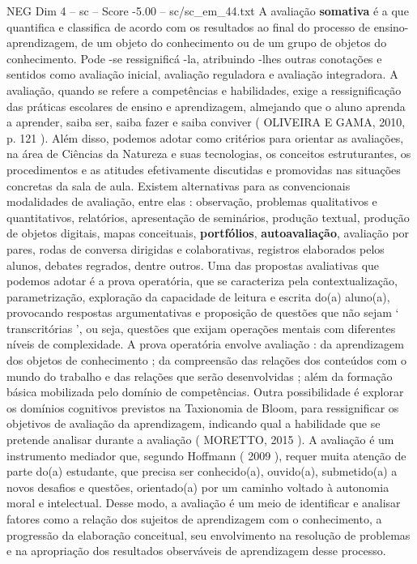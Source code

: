 \begin{textsample}{NEG Dim 4 – sc – Score -5.00 – sc/sc\_em\_44.txt}
A avaliação \textbf{somativa} é a que quantifica e classifica de acordo com os resultados ao final do processo de ensino-aprendizagem, de um objeto do conhecimento ou de um grupo de objetos do conhecimento.
Pode -se ressignificá -la, atribuindo -lhes outras conotações e sentidos como avaliação inicial, avaliação reguladora e avaliação integradora.
A avaliação, quando se refere a competências e habilidades, exige a ressignificação das práticas escolares de ensino e aprendizagem, almejando que o aluno aprenda a aprender, saiba ser, saiba fazer e saiba conviver ( OLIVEIRA E GAMA, 2010, p. 121 ).
Além disso, podemos adotar como critérios para orientar as avaliações, na área de Ciências da Natureza e suas tecnologias, os conceitos estruturantes, os procedimentos e as atitudes efetivamente discutidas e promovidas nas situações concretas da sala de aula.
Existem alternativas para as convencionais modalidades de avaliação, entre elas : observação, problemas qualitativos e quantitativos, relatórios, apresentação de seminários, produção textual, produção de objetos digitais, mapas conceituais, \textbf{portfólios}, \textbf{autoavaliação}, avaliação por pares, rodas de conversa dirigidas e colaborativas, registros elaborados pelos alunos, debates regrados, dentre outros.
Uma das propostas avaliativas que podemos adotar é a prova operatória, que se caracteriza pela contextualização, parametrização, exploração da capacidade de leitura e escrita do(a) aluno(a), provocando respostas argumentativas e proposição de questões que não sejam ‘ transcritórias ’, ou seja, questões que exijam operações mentais com diferentes níveis de complexidade.
A prova operatória envolve avaliação : da aprendizagem dos objetos de conhecimento ; da compreensão das relações dos conteúdos com o mundo do trabalho e das relações que serão desenvolvidas ; além da formação básica mobilizada pelo domínio de competências.
Outra possibilidade é explorar os domínios cognitivos previstos na Taxionomia de Bloom, para ressignificar os objetivos de avaliação da aprendizagem, indicando qual a habilidade que se pretende analisar durante a avaliação ( MORETTO, 2015 ).
A avaliação é um instrumento mediador que, segundo Hoffmann ( 2009 ), requer muita atenção de parte do(a) estudante, que precisa ser conhecido(a), ouvido(a), submetido(a) a novos desafios e questões, orientado(a) por um caminho voltado à autonomia moral e intelectual.
Desse modo, a avaliação é um meio de identificar e analisar fatores como a relação dos sujeitos de aprendizagem com o conhecimento, a progressão da elaboração conceitual, seu envolvimento na resolução de problemas e na apropriação dos resultados observáveis de aprendizagem desse processo.

\end{textsample}
